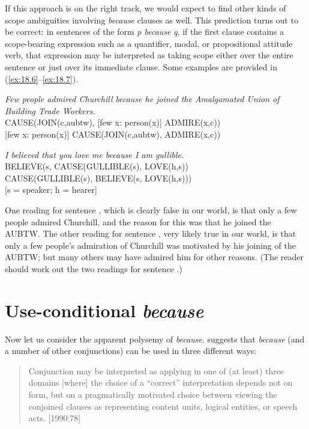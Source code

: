 If this approach is on the right track, we would expect to find other kinds of scope ambiguities involving \textit{because} clauses as well. This prediction turns out to be correct: in sentences of the form \textit{p because} \textit{q}, if the first clause contains a scope-bearing expression such as a quantifier, modal, or propositional attitude verb, that expression may be interpreted as taking scope either over the entire sentence or just over its immediate clause. Some examples are provided in (\ref{ex:18.6}--\ref{ex:18.7}).


\ea \label{ex:18.6}
\textit{Few people admired Churchill because he joined the Amalgamated Union of Building Trade Workers.}\\
\ea  CAUSE(JOIN(c,aubtw), [few x: person(x)] ADMIRE(x,c))\\
\ex{} [few x: person(x)] CAUSE(JOIN(c,aubtw), ADMIRE(x,c))
                       \z
\z

\ea \label{ex:18.7}
\textit{I believed that you love me because I am gullible.}\\
\ea  BELIEVE(s, CAUSE(GULLIBLE(s), LOVE(h,s))\\
\ex CAUSE(GULLIBLE(s), BELIEVE(s, LOVE(h,s)))\\
    {}[s = speaker; h = hearer]
                       \z
\z


One reading for sentence , which is clearly false in our world, is that only a few people admired Churchill, and the reason for this was that he joined the AUBTW. The other reading for sentence , very likely true in our world, is that only a few people’s admiration of Churchill was motivated by his joining of the AUBTW; but many others may have admired him for other reasons. (The reader should work out the two readings for sentence .)


\section{Use-conditional \textit{because}}\label{sec:18.3}

Now let us consider the apparent polysemy of \textit{because}. \citet[76--78]{Sweetser1990} suggests that \textit{because} (and a number of other conjunctions) can be used in three different ways: 


\begin{quote}
Conjunction may be interpreted as applying in one of (at least) three domains [where] the choice of a “correct” interpretation depends not on form, but on a pragmatically motivated choice between viewing the conjoined clauses as representing content units, logical entities, or speech acts. [1990:78]
\end{quote}

